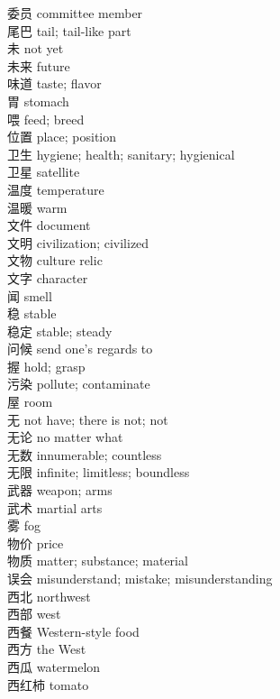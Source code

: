 委员 \quad committee member\\
尾巴 \quad tail; tail-like part\\
未 \quad not yet\\
未来 \quad future\\
味道 \quad taste; flavor\\
胃 \quad stomach\\
喂 \quad feed; breed\\
位置 \quad place; position\\
卫生 \quad hygiene; health; sanitary; hygienical\\
卫星 \quad satellite\\
温度 \quad temperature\\
温暖 \quad warm\\
文件 \quad document\\
文明 \quad civilization; civilized\\
文物 \quad culture relic\\
文字 \quad character\\
闻 \quad smell\\
稳 \quad stable\\
稳定 \quad stable; steady\\
问候 \quad send one's regards to\\
握 \quad hold; grasp\\
污染 \quad pollute; contaminate\\
屋 \quad room\\
无 \quad not have; there is not; not\\
无论 \quad no matter what\\
无数 \quad innumerable; countless\\
无限 \quad infinite; limitless; boundless\\
武器 \quad weapon; arms\\
武术 \quad martial arts\\
雾 \quad fog\\
物价 \quad price\\
物质 \quad matter; substance; material\\
误会 \quad misunderstand; mistake; misunderstanding\\
西北 \quad northwest\\
西部 \quad west\\
西餐 \quad Western-style food\\
西方 \quad the West\\
西瓜 \quad watermelon\\
西红柿 \quad tomato\\
